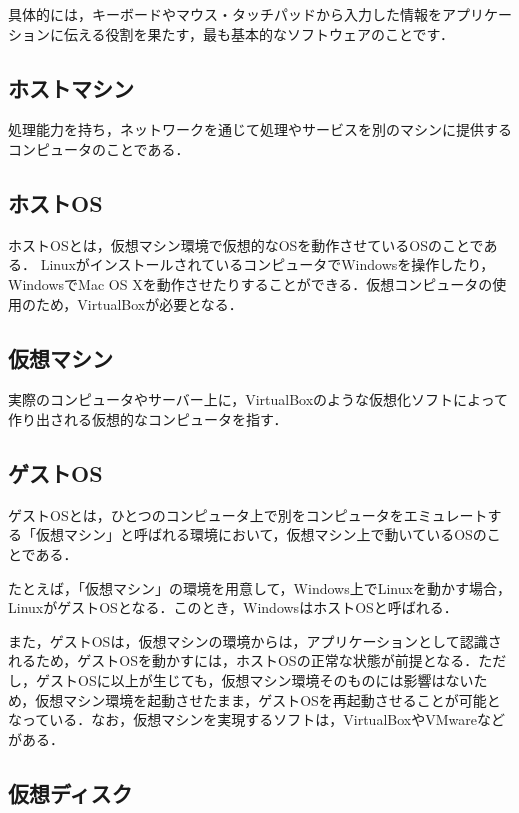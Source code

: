 具体的には，キーボードやマウス・タッチパッドから入力した情報をアプリケーションに伝える役割を果たす，最も基本的なソフトウェアのことです\cite{os}．


\subsection{ホストマシン}

処理能力を持ち，ネットワークを通じて処理やサービスを別のマシンに提供するコンピュータのことである\cite{host}．


\subsection{ホストOS}

ホストOSとは，仮想マシン環境で仮想的なOSを動作させているOSのことである．
LinuxがインストールされているコンピュータでWindowsを操作したり，WindowsでMac OS Xを動作させたりすることができる．仮想コンピュータの使用のため，VirtualBoxが必要となる．

\subsection{仮想マシン}

実際のコンピュータやサーバー上に，VirtualBoxのような仮想化ソフトによって作り出される仮想的なコンピュータを指す．


\subsection{ゲストOS}

ゲストOSとは，ひとつのコンピュータ上で別をコンピュータをエミュレートする「仮想マシン」と呼ばれる環境において，仮想マシン上で動いているOSのことである．

たとえば，「仮想マシン」の環境を用意して，Windows上でLinuxを動かす場合，LinuxがゲストOSとなる．このとき，WindowsはホストOSと呼ばれる．

また，ゲストOSは，仮想マシンの環境からは，アプリケーションとして認識されるため，ゲストOSを動かすには，ホストOSの正常な状態が前提となる．ただし，ゲストOSに以上が生じても，仮想マシン環境そのものには影響はないため，仮想マシン環境を起動させたまま，ゲストOSを再起動させることが可能となっている．なお，仮想マシンを実現するソフトは，VirtualBoxやVMwareなどがある．\cite{guest}



\subsection{仮想ディスク}

